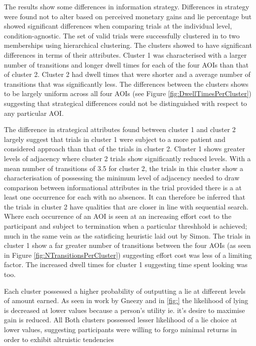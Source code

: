 \documentclass[man, floatsintext]{apa7}
\begin{document}
The results show some differences in information strategy. Differences in strategy were found not to alter based on perceived monetary gains and lie percentage but showed significant differences when comparing trials at the individual level, condition-agnostic. The set of valid trials were successfully clustered in to two memberships using hierarchical clustering. The clusters showed to have significant differences in terms of their attributes. Cluster 1 was characterised with a larger number of transitions and longer dwell times for each of the four AOIs than that of cluster 2. Cluster 2 had dwell times that were shorter and a average number of transitions that was significantly less. The differences between the clusters shows to be largely uniform across all four AOIs (see Figure \ref{fig:DwellTimesPerCluster}) suggesting that strategical differences could not be distinguished with respect to any particular AOI. 

The difference in strategical attributes found between cluster 1 and cluster 2 largely suggest that trials in cluster 1 were subject to a more patient and considered approach than that of the trials in cluster 2. Cluster 1 shows greater levels of adjacency where cluster 2 trials show significantly reduced levels. With a mean number of transitions of 3.5 for cluster 2, the trials in this cluster show a characterisation of possessing the minimum level of adjacency needed to draw comparison between informational attributes in the trial provided there is a at least one occurrence for each with no absences. It can therefore be inferred that the trials in cluster 2 have qualities that are closer in line with sequential search. Where each occurrence of an AOI is seen at an increasing effort cost to the participant and subject to termination when a particular threshhold is achieved; much in the same vein as the satisficing heuristic laid out by Simon. The trials in cluster 1 show a far greater number of transitions between the four AOIs (as seen in Figure \ref{fig:NTransitionsPerCluster}) suggesting effort cost was less of a limiting factor. The increased dwell times for cluster 1 suggesting time spent looking was too.

Each cluster possessed a higher probability of outputting a lie at different levels of amount earned. As seen in work by Gneezy and in \ref{fig:} the likelihood of lying is decreased at lower values because a person's utility ie. it's desire to maximise gain is reduced. All Both clusters possessed lesser likelihood of a lie choice at lower values, suggesting participants were willing to forgo minimal returns in order to exhibit altruistic tendencies
\end{document}
